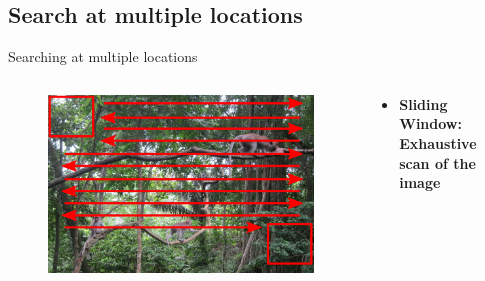 \documentclass{beamer}[10pt, usepdftitle=false, handout]
\begin{document}
    \subsection{Search at multiple locations}
    \begin{frame}

	Searching at multiple locations
	\vspace*{1.0em}	
	
\begin{columns}
\begin{column}{0.5\textwidth}
	\begin{figure}
		\includegraphics[scale=0.2]{monkey-2.jpg} 
	\end{figure}	 
\end{column}
\begin{column}{0.5\textwidth}  %
    \begin{center}
	\begin{itemize}
	\item{\textbf{Sliding Window: \newline Exhaustive scan of the image}}
	\end{itemize}	     
     
     \end{center}
\end{column}
\end{columns}	
	

			
    \end{frame}
\end{document}
